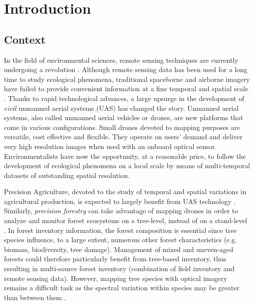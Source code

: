 \documentclass[remotesensing,article,submit,moreauthors,pdftex,12pt,a4paper]{mdpi} %
\begin{document}
\section{Introduction}

\subsection{Context}

In the field of environmental sciences, remote sensing techniques are currently undergoing a revolution \cite{anderson_lightweight_2013}. 
Although remote sensing data has been used for a long time to study ecological phenomena, traditional spaceborne and airborne imagery have failed to provide convenient information at a fine temporal and spatial scale \cite{anderson_lightweight_2013}. 
Thanks to rapid technological advances, a large upsurge in the development of \textit{civil} unmanned aerial systems (UAS) has changed the story. 
Unmanned aerial systems, also called unmanned aerial vehicles or drones, are new platforms that come in various configurations. 
Small drones devoted to mapping purposes are versatile, cost effective and flexible. 
They operate on users' demand and deliver very high resolution images when used with an onboard optical sensor. 
Environmentalists have now the opportunity, at a reasonable price, to follow the development of ecological phenomena on a local scale by means of multi-temporal datasets of outstanding spatial resolution.

Precision Agriculture, devoted to the study of temporal and spatial variations in agricultural production, is expected to largely benefit from UAS technology \cite{hunt_acquisition_2010}. 
Similarly, \textit{ precision forestry} can take advantage of mapping drones in order to analyze and monitor forest ecosystems on a tree-level, instead of on a stand-level \cite{drauschke_towards_2014}. 
In forest inventory information, the forest composition is essential since tree species influence, to a large extent, numerous other forest characteristics (e.g. biomass, biodiversity, tree damage). 
Management of mixed and uneven-aged forests could therefore particularly benefit from tree-based inventory, thus resulting in multi-source forest inventory (combination of field inventory and remote sensing data).
However, mapping tree species with optical imagery remains a difficult task as the spectral variation within species may be greater than between them \cite{key_comparison_2001,hill_mapping_2010, burkholder_seasonal_2011}.
\end{document}
